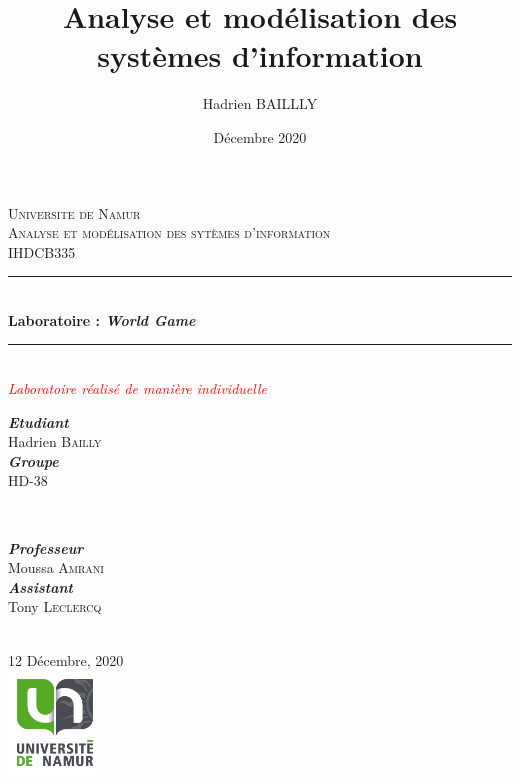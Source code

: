 \documentclass[oneside,a4paper]{book}
\title{Analyse et modélisation des systèmes d'information}
\author{Hadrien BAILLLY}
\date{Décembre 2020}
\begin{document}
\pagestyle{fancy}
\fancyhead{}
\renewcommand{\headrulewidth}{0pt}
\fancyfoot{}
\fancyfoot[R]{\thepage}
\sloppy

\begin{titlepage}

\newcommand{\HRule}{\rule{\linewidth}{0.5mm}} 
\center 

\textsc{\LARGE Universite de Namur}\\[2.5cm] 
\textsc{\Large Analyse et modélisation des sytèmes d'information\\[0.5cm] IHDCB335}\\[0.5cm]


\HRule \\[0.4cm]
{ \large \bfseries Laboratoire : \textit{World Game}}\\[0.4cm]
\HRule \\[1.5cm]

\textcolor{red}{
    {\large \textit{Laboratoire réalisé de manière individuelle}}
}\\[1.5cm]

\begin{minipage}{0.4\textwidth}
\begin{flushleft} \large
\emph{\textbf{Etudiant}}\\
Hadrien \textsc{Bailly}\\
\emph{\textbf{Groupe}}\\
HD-38
\end{flushleft}
\end{minipage}
~
\begin{minipage}{0.4\textwidth}
\begin{flushright} \large
\emph{\textbf{Professeur}} \\
Moussa \textsc{Amrani} \\
\emph{\textbf{Assistant}} \\
Tony \textsc{Leclercq} \\

\end{flushright}
\end{minipage}\\[2cm]
{\large 12 Décembre, 2020}\\[2cm] 
\includegraphics[width=25mm,scale=0.5]{unamur-logo.png}\\[1cm]
\vfill
\end{titlepage}
\end{document}
